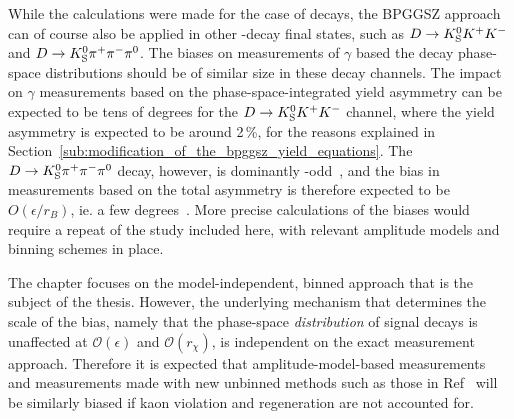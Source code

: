 While the calculations were made for the case of \DtoKspipi decays, the BPGGSZ approach can of course also be applied in other \D-decay final states, such as ${{D}\rightarrow{\ensuremath{{K}^0_{\mathrm{S}}}}{\ensuremath{{K}^+}}{\ensuremath{{K}^-}}}$ and ${D}\rightarrow{\ensuremath{{K}^0_{\mathrm{S}}}}{\ensuremath{{\pi}^+}}{\ensuremath{{\pi}^-}}{\ensuremath{{\pi}^0}}$. The biases on measurements of $\gamma$ based the \D decay phase-space distributions should be of similar size in these decay channels. The impact on $\gamma$ measurements based on the phase-space-integrated yield asymmetry can be expected to be tens of degrees for the ${D}\rightarrow{\ensuremath{{K}^0_{\mathrm{S}}}}{\ensuremath{{K}^+}}{\ensuremath{{K}^-}}$ channel, where the yield asymmetry is expected to be around 2\,\%, for the reasons explained in Section~\ref{sub:modification_of_the_bpggsz_yield_equations}. The ${D}\rightarrow{\ensuremath{{K}^0_{\mathrm{S}}}}{\ensuremath{{\pi}^+}}{\ensuremath{{\pi}^-}}{\ensuremath{{\pi}^0}}$ decay, however, is dominantly \CP-odd~\cite{CLEOKSpipipi0}, and the bias in measurements based on the total asymmetry is therefore expected to be $O(\epsilon/r_B)$, ie. a few degrees~\cite{grossmanEffectsBarMixing2014}. More precise calculations of the biases would require a repeat of the study included here, with relevant amplitude models and binning schemes in place.



The chapter focuses on the model-independent, binned approach that is the subject of the thesis. However, the underlying mechanism that determines the scale of the bias, namely that the phase-space \emph{distribution} of signal decays is unaffected at $\mathcal O(\epsilon)$ and $\mathcal O(r_\chi)$, is independent on the exact measurement approach. Therefore it is expected that amplitude-model-based measurements and measurements made with new unbinned methods such as those in Ref~\cite{poluektovUnbinnedModelindependentMeasurements2018} will be similarly biased if kaon \CP violation and regeneration are not accounted for. 



